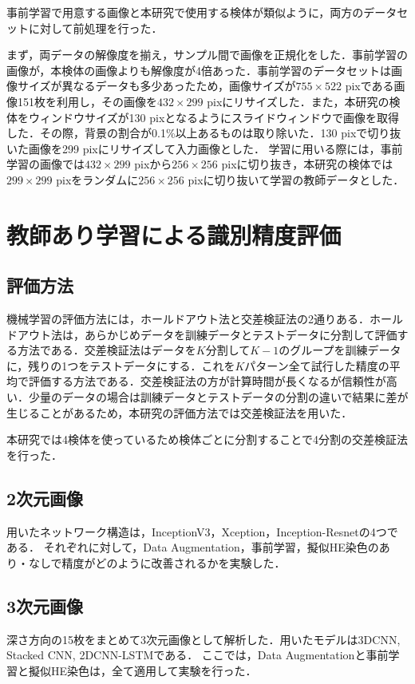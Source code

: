事前学習で用意する画像と本研究で使用する検体が類似ように，両方のデータセットに対して前処理を行った．

まず，両データの解像度を揃え，サンプル間で画像を正規化をした．事前学習の画像が，本検体の画像よりも解像度が4倍あった．事前学習のデータセットは画像サイズが異なるデータも多少あったため，画像サイズが$755 \times 522$ pixである画像151枚を利用し，その画像を$432 \times 299$ pixにリサイズした．また，本研究の検体をウィンドウサイズが130 pixとなるようにスライドウィンドウで画像を取得した．その際，背景の割合が0.1\%以上あるものは取り除いた．130 pixで切り抜いた画像を299 pixにリサイズして入力画像とした．
学習に用いる際には，事前学習の画像では$432 \times 299$ pixから$256 \times 256$ pixに切り抜き，本研究の検体では$299 \times 299$ pixをランダムに$256 \times 256$ pixに切り抜いて学習の教師データとした．


\section{教師あり学習による識別精度評価}

\subsection{評価方法}
機械学習の評価方法には，ホールドアウト法と交差検証法の2通りある．ホールドアウト法は，あらかじめデータを訓練データとテストデータに分割して評価する方法である．交差検証法はデータを$K$分割して$K-1$のグループを訓練データに，残りの1つをテストデータにする．これを$K$パターン全て試行した精度の平均で評価する方法である．交差検証法の方が計算時間が長くなるが信頼性が高い．少量のデータの場合は訓練データとテストデータの分割の違いで結果に差が生じることがあるため，本研究の評価方法では交差検証法を用いた．

本研究では4検体を使っているため検体ごとに分割することで4分割の交差検証法を行った．

\subsection*{2次元画像}
用いたネットワーク構造は，InceptionV3，Xception，Inception-Resnetの4つである．
それぞれに対して，Data Augmentation，事前学習，擬似HE染色のあり・なしで精度がどのように改善されるかを実験した．

\subsection*{3次元画像}
深さ方向の15枚をまとめて3次元画像として解析した．用いたモデルは3DCNN, Stacked CNN, 2DCNN-LSTMである．
ここでは，Data Augmentationと事前学習と擬似HE染色は，全て適用して実験を行った．



